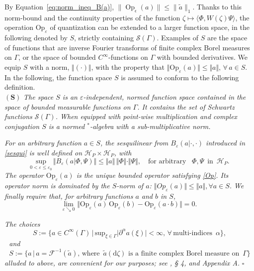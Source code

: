 \documentclass[11pt]{article}
\DeclareMathOperator{\Op}{Op}
\begin{document}
By Equation~\eqref{eq:norm_ineq_B(a)}, $\|\Op_\epsilon(a)\|\leq \|\tilde a\|_1$.
Thanks to this norm-bound and the continuity properties of the function 
$\zeta \mapsto \langle \Phi, W(\zeta)\Psi \rangle$, the operation $\text{Op}_{\varepsilon}$ of quantization 
can be extended to a larger function space, in the following denoted by $S$, strictly containing 
$\mathcal{S}(\Gamma)$. Examples of $S$ are the space of functions that are inverse Fourier transforms 
of finite complex Borel measures on $\Gamma$, or the space of bounded $C^{\infty}$-functions on $\Gamma$ with bounded derivatives. 
We equip $S$ with a norm, $\Vert (\cdot) \Vert$, with the property that 
$\Vert \text{Op}_\varepsilon(a)\Vert\leq \Vert a \Vert, \,\forall \, a \in S.$ In the following, the function space $S$ is
assumed to conform to the following definition.\\

$\mathbf{(S)}$ \textit{The space $S$ is an $\varepsilon$-independent, normed function 
space contained in the space of bounded measurable functions on $\Gamma$. It contains the set of Schwartz functions $\mathcal S(\Gamma)$. When equipped with point-wise multiplication and complex conjugation $S$ is a normed $^{*}$-algebra with a sub-multiplicative norm.}

\textit{For an arbitrary function $a\in S$, the sesquilinear from $B_{\varepsilon}(a|\cdot, \cdot)$ introduced in \eqref{sesqui} is 
well defined on $\mathcal{H}_P\times \mathcal{H}_P$, with
$$\underset{0<\varepsilon\leq \varepsilon_0}{\text{sup}}\, \Vert B_{\varepsilon}(a |\Phi, \Psi) \Vert \leq \Vert a \Vert\,
 \Vert \Phi\Vert\cdot \Vert \Psi \Vert, \quad \text{for arbitrary }\,\,\, \Phi, \Psi \,\text{ in }\, \mathcal{H}_P.$$ 
The operator $\text{Op}_{\varepsilon}(a)$ is the unique bounded operator satisfying \eqref{Op}. Its operator norm is dominated by the $S$-norm of $a$:
$\Vert Op_{\varepsilon}(a) \Vert \leq \Vert a \Vert, \forall a \in S$.}
\textit{We finally require that,
for arbitrary functions $a$ and $b$ in $S$,}
\begin{equation}\label{class lim}
\underset{\varepsilon \searrow 0}{\text{lim}}\,\, \Vert \text{Op}_{\varepsilon}(a)\, \text{Op}_{\varepsilon}(b) - 
\text{Op}_{\varepsilon} (a\cdot b) \Vert = 0.
\end{equation}
 
  \textit{The choices}
 $$S:=\big\{ a\in C^{\infty}(\Gamma)\, \big|\, \text{sup}_{\xi \in \Gamma} \vert \partial^{\alpha} a(\xi)\vert < \infty, \, \forall \, \text{multi-indices }\, \alpha\big\},$$
\,\, \textit{and}
 $$S:= \big\{a \,\big| \, a = \mathcal{F}^{-1} (\tilde{a}), \, \text{where }\,\tilde{a}(\text{d}\zeta) \text{ is a finite complex Borel measure on }\, \Gamma \big\}$$
 \vspace{0.15cm}
\textit{ alluded to above, are convenient for our purposes; see \cite{Zworski}, § 4, and  Appendix A.} \hfill{\large{$\square$}}
\end{document}
